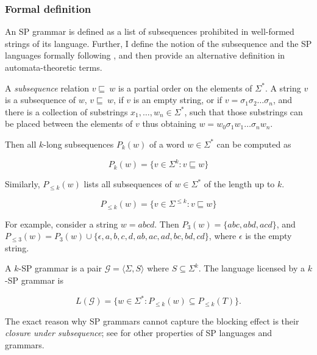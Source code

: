 \subsubsection{Formal definition}

An SP grammar is defined as a list of subsequences prohibited in well-formed strings of its language.
Further, I define the notion of the subsequence and the SP languages formally following \cite{Rogers-HeinzEtAl-2010-LPTSS}, and then provide an alternative definition in automata-theoretic terms.



\begin{definition}
A \emph{subsequence} relation $v \sqsubseteq~ w$ is a partial order on the elements of $\Sigma^*$.
A string $v$ is a subsequence of $w$, $v \sqsubseteq~ w$, if $v$ is an empty string, or if $v = \sigma_1\sigma_2\dots\sigma_n$, and there is a collection of substrings $x_1, \dots, w_n \in \Sigma^*$, such that those substrings can be placed between the elements of $v$ thus obtaining $w = w_0\sigma_1 w_1\dots\sigma_n w_n$.

Then all $k$-long subsequences $P_k(w)$ of a word $w \in \Sigma^*$ can be computed as

$$ P_{k}(w) = \{v \in \Sigma^{k} : v \sqsubseteq w\} $$

Similarly, $P_{\leq k}(w)$ lists all subsequences of $w \in \Sigma^*$  of the length up to $k$.

$$ P_{\leq k}(w) = \{v \in \Sigma^{\leq k} : v \sqsubseteq w\} $$
\end{definition}



For example, consider a string $w = abcd$.
Then $P_{3}(w) = \{abc, abd, acd\}$, and $P_{\leq 3}(w) = P_{3}(w) \cup \{\epsilon, a, b, c, d, ab, ac, ad, bc, bd, cd\}$, where $\epsilon$ is the empty string.

\begin{definition}
A $k$-SP grammar is a pair $\mathcal{G} = \langle \Sigma, S\rangle$ where $S \subseteq \Sigma^k$. The language licensed by a $k$-SP grammar is

\[
	L(\mathcal{G}) = \{w \in \Sigma^* : P_{\leq k}(w) \subseteq P_{\leq k}(T)\}.
\]
\end{definition}

The exact reason why SP grammars cannot capture the blocking effect is their \emph{closure under subsequence}; see \citep{Rogers-HeinzEtAl-2010-LPTSS} for other properties of SP languages and grammars.

